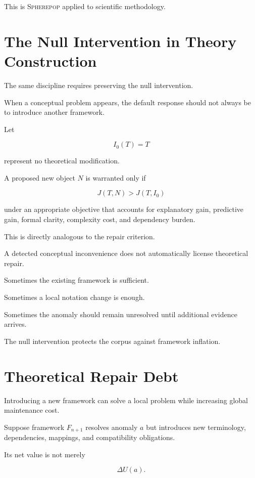 \documentclass[11pt]{article}
\theoremstyle{remark}
\newcommand{\Spherepop}{\textsc{Spherepop}}
\begin{document}
This is \Spherepop{} applied to scientific methodology.

\section{The Null Intervention in Theory Construction}

The same discipline requires preserving the null intervention.

When a conceptual problem appears, the default response should not always be to
introduce another framework.

Let

\begin{equation}
I_0(T)=T
\end{equation}

represent no theoretical modification.

A proposed new object $N$ is warranted only if

\begin{equation}
J(T,N)
>
J(T,I_0)
\end{equation}

under an appropriate objective that accounts for explanatory gain,
predictive gain, formal clarity, complexity cost, and dependency burden.

This is directly analogous to the repair criterion.

A detected conceptual inconvenience does not automatically license theoretical
repair.

Sometimes the existing framework is sufficient.

Sometimes a local notation change is enough.

Sometimes the anomaly should remain unresolved until additional evidence
arrives.

The null intervention protects the corpus against framework inflation.

\section{Theoretical Repair Debt}

Introducing a new framework can solve a local problem while increasing global
maintenance cost.

Suppose framework $F_{n+1}$ resolves anomaly $a$ but introduces new terminology,
dependencies, mappings, and compatibility obligations.

Its net value is not merely

\begin{equation}
\Delta U(a).
\end{equation}
\end{document}
